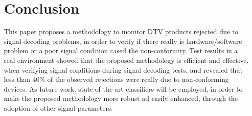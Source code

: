 \documentclass[conference]{IEEEtran}
\begin{document}
%






\section{Conclusion}
This paper proposes a methodology to monitor DTV products rejected due to signal decoding problems, in order to verify if there really is hardware/software problem or a poor signal condition cased the non-conformity. Test results in a real environment showed that the proposed methodology is efficient and effective, when verifying signal conditions during signal decoding tests, and revealed that less than $40\%$ of the observed rejections were really due to non-conforming devices. As future work, state-of-the-art classifiers will be employed, in order to make the proposed methodology more robust ad easily enhanced, through the adoption of other signal parameters.
\end{document}
